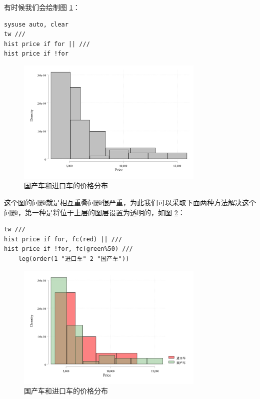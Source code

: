 \documentclass[]{ctexbook}
\begin{document}
有时候我们会绘制图 \ref{fig:histautoprice}：

\begin{lstlisting}
sysuse auto, clear
tw ///
hist price if for || ///
hist price if !for
\end{lstlisting}

\begin{figure}

{\centering \includegraphics[width=0.8\textwidth]{assets/histautoprice} 

}

\caption{国产车和进口车的价格分布}\label{fig:histautoprice}
\end{figure}

这个图的问题就是相互重叠问题很严重，为此我们可以采取下面两种方法解决这个问题，第一种是将位于上层的图层设置为透明的，如图 \ref{fig:histautoprice2}：

\begin{lstlisting}
tw ///
hist price if for, fc(red) || ///
hist price if !for, fc(green%50) ///
    leg(order(1 "进口车" 2 "国产车"))
\end{lstlisting}

\begin{figure}

{\centering \includegraphics[width=0.8\textwidth]{assets/histautoprice2} 

}

\caption{国产车和进口车的价格分布}\label{fig:histautoprice2}
\end{figure}
\end{document}
